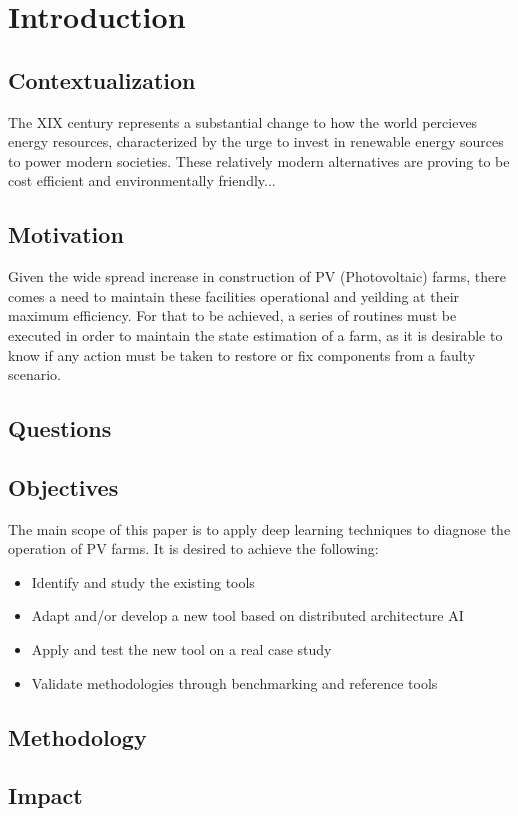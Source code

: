 \chapter{Introduction} \label{chap:intro}

\section{Contextualization}

The XIX century represents a substantial change to how the world percieves energy resources,
characterized by the urge to invest in renewable energy sources to power modern societies.
These relatively modern alternatives are proving to be cost efficient and environmentally friendly...

\section{Motivation}
Given the wide spread increase in construction of PV (Photovoltaic) farms, there comes a need 
to maintain these facilities operational and yeilding at their maximum efficiency.
For that to be achieved, a series of routines must be executed in order to
maintain the state estimation of a farm, as it is desirable to know if any action must be taken to
restore or fix components from a faulty scenario.

\section{Questions}

\section{Objectives}

The main scope of this paper is to apply deep learning techniques to diagnose the operation of PV farms.
It is desired to achieve the following:

\begin{itemize}
  \item Identify and study the existing tools
  \item Adapt and/or develop a new tool based on distributed architecture AI
  \item Apply and test the new tool on a real case study
  \item Validate methodologies through benchmarking and reference tools
\end{itemize}

\section{Methodology}

\section{Impact}
